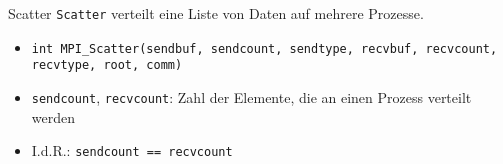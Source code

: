 \documentclass{beamer}
\begin{document}
\begin{frame}{Scatter}
	\texttt{Scatter} verteilt eine Liste von Daten auf mehrere Prozesse.

	\begin{figure}
	\end{figure}

	\begin{itemize}
		\item {\footnotesize \texttt{int MPI\_Scatter(sendbuf, sendcount, sendtype, recvbuf, recvcount, recvtype, root, comm)}}
		\item \texttt{sendcount}, \texttt{recvcount}: Zahl der Elemente, die an einen Prozess verteilt werden
		\item I.d.R.: \texttt{sendcount == recvcount}
	\end{itemize}
\end{frame}
\end{document}
